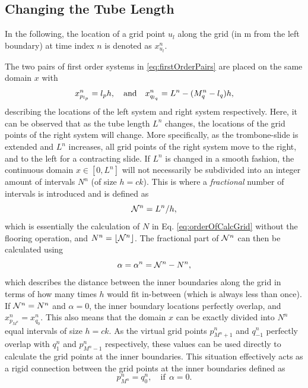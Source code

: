 \subsection{Changing the Tube Length}
In the following, the location of a grid point $u_l$ along the grid (in m from the left boundary) at time index $n$ is denoted as $x_{u_l}^n$.

The two pairs of first order systems in \eqref{eq:firstOrderPairs} are placed on the same domain $x$ with
\begin{equation}\label{eq:gridLocations}
    x_{p_{l_p}}^n = {l_p} h, \quad \text{and}\quad
    x_{q_{l_q}}^n = L^n-(M_q^n - {l_q})h,
\end{equation}
describing the locations of the left system and right system respectively. Here, it can be observed that as the tube length $L^n$ changes, the locations of the grid points of the right system will change. More specifically, as the trombone-slide is extended and $L^n$ increases, all grid points of the right system move to the right, and to the left for a contracting slide. If $L^n$ is changed in a smooth fashion, the continuous domain $x \in [0,L^n]$ will not necessarily be subdivided into an integer amount of intervals $N^n$ (of size $h = ck$). This is where a \textit{fractional} number of intervals is introduced and is defined as 
\begin{equation}\label{eq:nfrac}
    \mathcal{N}^n = L^n/h,
\end{equation}
which is essentially the calculation of $N$ in Eq. \eqref{eq:orderOfCalcGrid} without the flooring operation, and $N^n = \lfloor \mathcal{N}^n \rfloor$. The fractional part of $\mathcal{N}^n$ can then be calculated using
\begin{equation}\label{eq:alphaDef}
    \alpha = \alpha^n = \mathcal{N}^n - N^n,
\end{equation}
which describes the distance between the inner boundaries along the grid in terms of how many times $h$ would fit in-between (which is always less than once). If $\mathcal{N}^n = N^n$ and $\alpha = 0$, the inner boundary locations perfectly overlap, and $x_{p_{M^n}}^n = x_{q_0}^n$. This also means that the domain $x$ can be exactly divided into $N^n$ equal intervals of size $h = ck$. As the virtual grid points $p_{M^n+1}^n$ and $q_{-1}^n$ perfectly overlap with $q_{1}^n$ and $p_{M^n-1}^n$ respectively, these values can be used directly to calculate the grid points at the inner boundaries. This situation effectively acts as a rigid connection between the grid points at the inner boundaries defined as
\begin{equation}\label{eq:rigidConn}
    p_{M^n}^n = q_0^n, \quad \text{if} \ \  \alpha = 0.
\end{equation}
